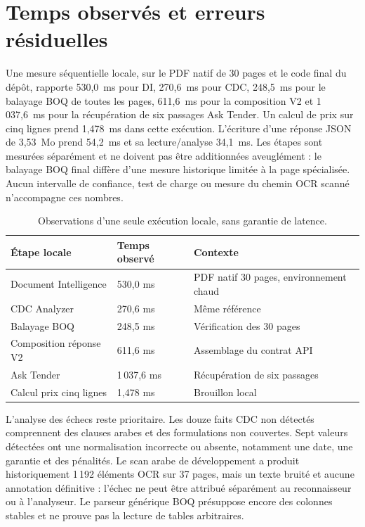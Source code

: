\section{Temps observés et erreurs résiduelles}
Une mesure séquentielle locale, sur le PDF natif de 30 pages et le code final du dépôt, rapporte 530,0~ms pour DI, 270,6~ms pour CDC, 248,5~ms pour le balayage BOQ de toutes les pages, 611,6~ms pour la composition V2 et 1\,037,6~ms pour la récupération de six passages Ask Tender. Un calcul de prix sur cinq lignes prend 1,478~ms dans cette exécution. L'écriture d'une réponse JSON de 3,53~Mo prend 54,2~ms et sa lecture/analyse 34,1~ms. Les étapes sont mesurées séparément et ne doivent pas être additionnées aveuglément : le balayage BOQ final diffère d'une mesure historique limitée à la page spécialisée. Aucun intervalle de confiance, test de charge ou mesure du chemin OCR scanné n'accompagne ces nombres.

\begin{table}[htbp]\centering\tighttable
\begin{tabularx}{\textwidth}{@{}p{38mm}p{25mm}Y@{}}\toprule
Étape locale & Temps observé & Contexte\\\midrule
Document Intelligence & 530,0 ms & PDF natif 30 pages, environnement chaud\\
CDC Analyzer & 270,6 ms & Même référence\\
Balayage BOQ & 248,5 ms & Vérification des 30 pages\\
Composition réponse V2 & 611,6 ms & Assemblage du contrat API\\
Ask Tender & 1\,037,6 ms & Récupération de six passages\\
Calcul prix cinq lignes & 1,478 ms & Brouillon local\\\bottomrule
\end{tabularx}
\caption{Observations d'une seule exécution locale, sans garantie de latence.}\label{tab:performance}
\end{table}

L'analyse des échecs reste prioritaire. Les douze faits CDC non détectés comprennent des clauses arabes et des formulations non couvertes. Sept valeurs détectées ont une normalisation incorrecte ou absente, notamment une date, une garantie et des pénalités. Le scan arabe de développement a produit historiquement 1\,192 éléments OCR sur 37 pages, mais un texte bruité et aucune annotation définitive : l'échec ne peut être attribué séparément au reconnaisseur ou à l'analyseur. Le parseur générique BOQ présuppose encore des colonnes stables et ne prouve pas la lecture de tables arbitraires.

